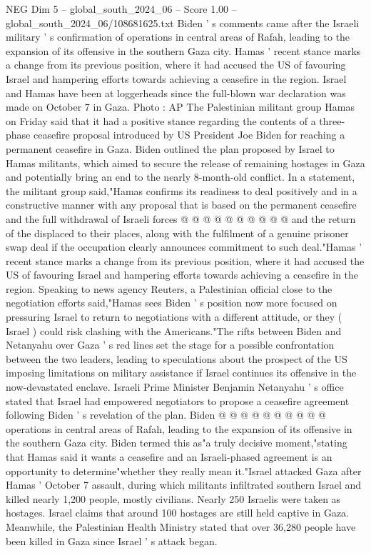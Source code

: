 \begin{textsample}{NEG Dim 5 – global\_south\_2024\_06 – Score 1.00 – global\_south\_2024\_06/108681625.txt}  \label{ex:f5_neg_226}
Biden ' s comments came after the Israeli military ' s confirmation of operations in central areas of Rafah, leading to the expansion of its offensive in the southern Gaza city.
Hamas ' recent stance marks a change from its previous position, where it had accused the US of favouring Israel and hampering efforts towards achieving a ceasefire in the region.
Israel and Hamas have been at loggerheads since the full-blown war declaration was made on October 7 in Gaza.
Photo : AP The Palestinian militant group Hamas on Friday said that it had a positive stance regarding the contents of a three-phase ceasefire proposal introduced by US President Joe Biden for reaching a permanent ceasefire in Gaza.
Biden outlined the plan proposed by Israel to Hamas militants, which aimed to secure the release of remaining hostages in Gaza and potentially bring an end to the nearly 8-month-old conflict.
In a statement, the militant group said,"Hamas confirms its readiness to deal positively and in a constructive manner with any proposal that is based on the permanent ceasefire and the full withdrawal of Israeli forces @ @ @ @ @ @ @ @ @ @ and the return of the displaced to their places, along with the fulfilment of a genuine prisoner swap deal if the occupation clearly announces commitment to such deal."Hamas ' recent stance marks a change from its previous position, where it had accused the US of favouring Israel and hampering efforts towards achieving a ceasefire in the region.
Speaking to news agency Reuters, a Palestinian official close to the negotiation efforts said,"Hamas sees Biden ' s position now more focused on pressuring Israel to return to negotiations with a different attitude, or they ( Israel ) could risk clashing with the Americans."The rifts between Biden and Netanyahu over Gaza ' s red lines set the stage for a possible confrontation between the two leaders, leading to speculations about the prospect of the US imposing limitations on military assistance if Israel continues its offensive in the now-devastated enclave.
Israeli Prime Minister Benjamin Netanyahu ' s office stated that Israel had empowered negotiators to propose a ceasefire agreement following Biden ' s revelation of the plan.
Biden @ @ @ @ @ @ @ @ @ @ operations in central areas of Rafah, leading to the expansion of its offensive in the southern Gaza city.
Biden termed this as"a truly decisive moment,"stating that Hamas said it wants a ceasefire and an Israeli-phased agreement is an opportunity to determine"whether they really mean it."Israel attacked Gaza after Hamas ' October 7 assault, during which militants infiltrated southern Israel and killed nearly 1,200 people, mostly civilians.
Nearly 250 Israelis were taken as hostages.
Israel claims that around 100 hostages are still held captive in Gaza.
Meanwhile, the Palestinian Health Ministry stated that over 36,280 people have been killed in Gaza since Israel ' s attack began.

\end{textsample}
